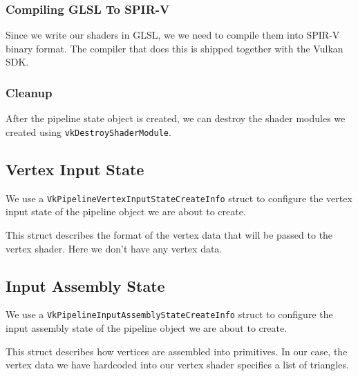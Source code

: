 \subsubsection{Compiling GLSL To SPIR-V}

Since we write our shaders in GLSL, we
we need to compile them into SPIR-V binary format.
The compiler that does this is shipped together with the Vulkan SDK.

\subsubsection{Cleanup}

After the pipeline state object is created, we can destroy the shader modules
we created using \texttt{vkDestroyShaderModule}.

\subsection{Vertex Input State}

We use a \texttt{VkPipelineVertexInputStateCreateInfo} struct to configure the
vertex input state of the pipeline object we are about to create.

This struct describes the format of the vertex data that will be passed
to the vertex shader.
Here we don't have any vertex data.

\begin{minipage}{\linewidth}{\noindent}
    
\end{minipage}

\subsection{Input Assembly State}

We use a \texttt{VkPipelineInputAssemblyStateCreateInfo} struct to configure the
input assembly state of the pipeline object we are about to create.

This struct describes how vertices are assembled into primitives.
In our case, the vertex data we have hardcoded into our vertex shader specifies
a list of triangles.

\begin{minipage}{\linewidth}{\noindent}
    
\end{minipage}

